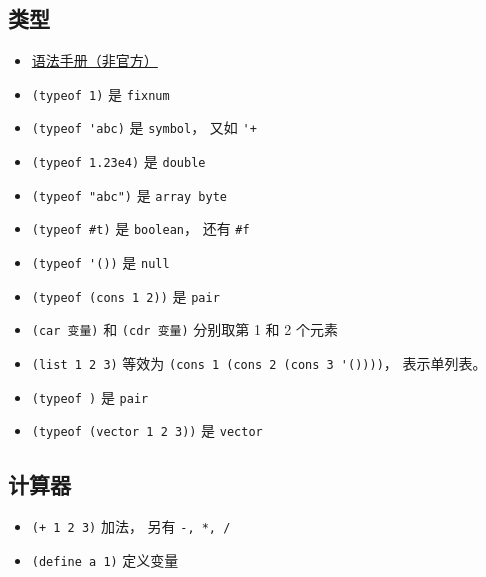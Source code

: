
\subsection{类型}
\begin{itemize}
\item \href{https://code.google.com/archive/p/femtolisp/wikis/Manual.wiki}{语法手册（非官方）}
\item \verb`(typeof 1)` 是 \verb`fixnum`
\item \verb`(typeof 'abc)` 是 \verb`symbol`， 又如 \verb`'+`
\item \verb`(typeof 1.23e4)` 是 \verb`double`
\item \verb`(typeof "abc")` 是 \verb`array byte`
\item \verb`(typeof #t)` 是 \verb`boolean`， 还有 \verb`#f`
\item \verb`(typeof '())` 是 \verb`null`
\item \verb`(typeof (cons 1 2))` 是 \verb`pair`
\item \verb`(car 变量)` 和 \verb`(cdr 变量)` 分别取第 1 和 2 个元素
\item \verb`(list 1 2 3)` 等效为 \verb`(cons 1 (cons 2 (cons 3 '())))`， 表示单列表。
\item \verb`(typeof )` 是 \verb`pair`
\item \verb`(typeof (vector 1 2 3))` 是 \verb`vector`
\end{itemize}

\subsection{计算器}
\begin{itemize}
\item \verb`(+ 1 2 3)` 加法， 另有 \verb`-, *, /`
\item \verb`(define a 1)` 定义变量
\end{itemize}
